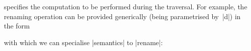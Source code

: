 \documentclass[sigplan,review,fleqn]{acmart}
\renewcommand{\verb}{\collectverb{\color{AgdaFunction}}}
\newcommand{\name}{\collectverb{\it}}
\begin{document}
specifies the computation to be performed during the traversal.
For example, the renaming operation can be provided generically (being parametrised by~\name|d|\/) in the form
\begin{code}
	\>[0]\AgdaSpace{}%
	\AgdaSymbol{:}\AgdaSpace{}%
	\AgdaSymbol{(}\AgdaSpace{}%
	\AgdaSymbol{:}\AgdaSpace{}%
	\AgdaSpace{}%
	\AgdaSymbol{)}\AgdaSpace{}%
	\AgdaSpace{}%
	\AgdaSpace{}%
	\AgdaSpace{}%
	\AgdaSpace{}%
	\AgdaSymbol{(}\AgdaSpace{}%
	\AgdaSymbol{)}\<%
\end{code}
with which we can specialise \verb|semantics| to \verb|rename|:
\begin{code}
	\>[0]\AgdaSpace{}%
	\>[1]\AgdaSymbol{:}\AgdaSpace{}%
	\AgdaSpace{}%
	\AgdaSymbol{\{}\AgdaSymbol{\}}\AgdaSpace{}%
	\AgdaSpace{}%
	\AgdaSpace{}%
	\AgdaSpace{}%
	\AgdaSpace{}%
	\AgdaSpace{}%
	\AgdaSpace{}%
	\AgdaSpace{}%
	\AgdaSymbol{)}\AgdaSpace{}\<%
	\\%
	\>[1]\AgdaSpace{}%
	\AgdaSpace{}%
	\AgdaSpace{}%
	\AgdaSpace{}%
	\AgdaSpace{}%
	\AgdaSpace{}%
	\AgdaSpace{}%
	\AgdaSpace{}%
	\AgdaSpace{}%
	\<%
	\\
	\>[0]\AgdaSpace{}%
	\AgdaSymbol{=}\AgdaSpace{}%
	\AgdaSpace{}%
	\AgdaSymbol{(}\AgdaSpace{}%
	\AgdaSymbol{)}\AgdaSpace{}\<%
\end{code}
\end{document}
